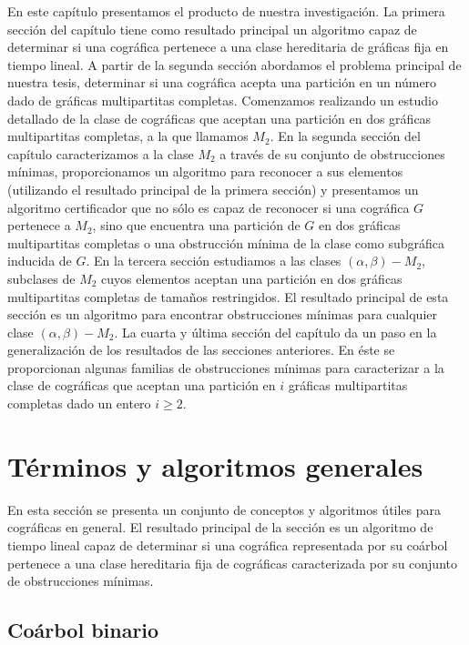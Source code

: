 En este capítulo presentamos el producto de nuestra investigación. La primera
sección del capítulo tiene como resultado principal un algoritmo capaz de
determinar si una cográfica pertenece a una clase hereditaria de gráficas fija
en tiempo lineal. A partir de la segunda sección abordamos el problema
principal de nuestra tesis, determinar si una cográfica acepta una partición en
un número dado de gráficas multipartitas completas. Comenzamos realizando un
estudio detallado de la clase de cográficas que aceptan una partición en dos
gráficas multipartitas completas, a la que llamamos $M_2$. En la segunda
sección del capítulo caracterizamos a la clase $M_2$ a través de su conjunto de
obstrucciones mínimas, proporcionamos un algoritmo para reconocer a sus
elementos (utilizando el resultado principal de la primera sección) y
presentamos un algoritmo certificador que no sólo es capaz de reconocer si una
cográfica $G$ pertenece a  $M_2$, sino que encuentra una partición de $G$ en
dos gráficas multipartitas completas o una obstrucción mínima de la clase como
subgráfica inducida de $G$. En la tercera sección estudiamos a las clases
$(\alpha, \beta)-M_2$, subclases de $M_2$ cuyos elementos aceptan una partición
en dos gráficas multipartitas completas de tamaños restringidos. El resultado
principal de esta sección es un algoritmo para encontrar obstrucciones mínimas
para cualquier clase $(\alpha, \beta)-M_2$. La cuarta y última sección del
capítulo da un paso en la generalización de los resultados de las secciones
anteriores. En éste se proporcionan algunas familias de obstrucciones mínimas
para caracterizar a la clase de cográficas que aceptan una partición en $i$
gráficas multipartitas completas dado un entero $i \geq 2$.

\section{Términos y algoritmos generales}

    En esta sección se presenta un conjunto de conceptos y algoritmos
    \'utiles para cogr\'aficas en general. El resultado
    principal de la sección es un algoritmo de tiempo lineal capaz de
    determinar si una cográfica representada por su coárbol pertenece a una
    clase hereditaria fija de cográficas caracterizada por su conjunto de
    obstrucciones mínimas.

    \subsection{Coárbol binario}
        
